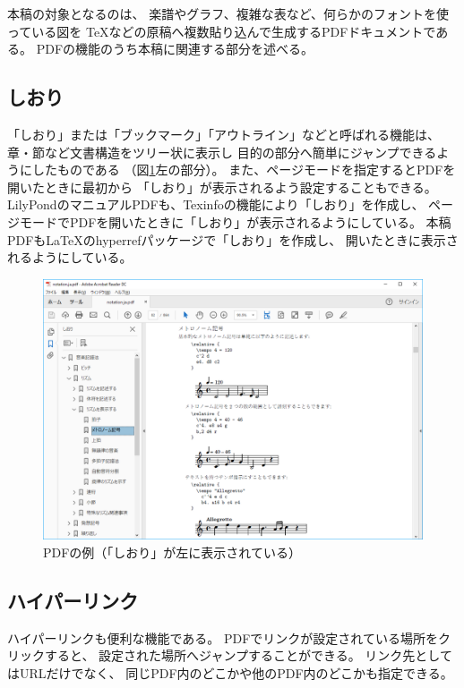 \documentclass[twocolumn,jafontscale=0.962216,jlreq_notes]{jlreq}
\begin{document}
本稿の対象となるのは、
楽譜やグラフ、複雑な表など、何らかのフォントを使っている図を
\TeX などの原稿へ複数貼り込んで生成するPDFドキュメントである。
PDFの機能のうち本稿に関連する部分を述べる。

\subsection{しおり}

「しおり」または「ブックマーク」「アウトライン」などと呼ばれる機能は、
章・節など文書構造をツリー状に表示し
目的の部分へ簡単にジャンプできるようにしたものである
（図\ref{fig:notation-ja-capture}左の部分）。
また、ページモードを指定するとPDFを開いたときに最初から
「しおり」が表示されるよう設定することもできる。
LilyPondのマニュアルPDFも、Texinfoの機能により「しおり」を作成し、
ページモードでPDFを開いたときに「しおり」が表示されるようにしている。
本稿PDFも\LaTeX のhyperrefパッケージで「しおり」を作成し、
開いたときに表示されるようにしている。

\begin{figure}
  \centering
  \includegraphics[width=0.95\linewidth]{notation-ja-capture.png}
  \caption{PDFの例（「しおり」が左に表示されている）}
  \label{fig:notation-ja-capture}
\end{figure}

\subsection{ハイパーリンク}

ハイパーリンクも便利な機能である。
PDFでリンクが設定されている場所をクリックすると、
設定された場所へジャンプすることができる。
リンク先としてはURLだけでなく、
同じPDF内のどこかや他のPDF内のどこかも指定できる。
\end{document}

